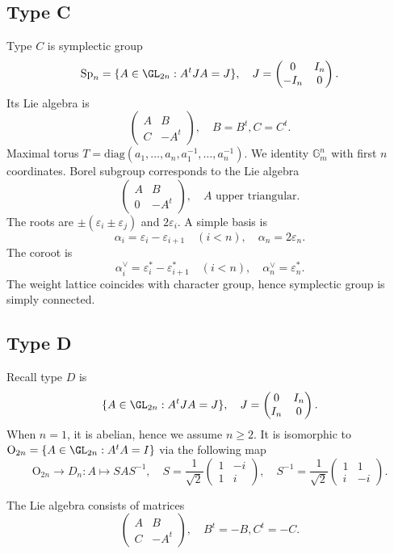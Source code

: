\documentclass[a4paper]{amsart}
\newcommand{\BG}{{\mathbb {G}}} \newcommand{\BH}{{\mathbb {H}}}
\newcommand{\RO}{{\mathrm {O}}} \newcommand{\RP}{{\mathrm {P}}}
\newcommand{\diag}{{\mathrm{diag}}}
\newcommand{\Sp}{{\mathrm{Sp}}}\newcommand{\PB}{{\mathrm{PB}}}
\theoremstyle{plain}
\theoremstyle{remark} \newtheorem{remark}[thm]{Remark}
\theoremstyle{remark} \newtheorem{exercise}{Exercise}
\theoremstyle{remark} \newtheorem{example}{Example}
\numberwithin{equation}{section}
\begin{document}
\subsection{Type C}

Type $C$ is symplectic group
\[\Sp_n=\{A\in\GL_{2n}:A^tJA=J\},\quad J=\begin{pmatrix}0&I_n\\-I_n&0\end{pmatrix}.\]
Its Lie algebra is
\[\begin{pmatrix}A&B\\C&-A^t\end{pmatrix},\quad B=B^t,C=C^t.\]
Maximal torus $T=\diag(a_1,\ldots,a_n,a_1^{-1},\ldots,a_n^{-1})$. We identity $\BG_m^n$ with first $n$ coordinates. Borel subgroup corresponds to the Lie algebra
\[\begin{pmatrix}A&B\\0&-A^t\end{pmatrix},\quad A\text{ upper triangular}.\]
The roots are $\pm(\varepsilon_i\pm\varepsilon_j)$ and $2\varepsilon_i$. A simple basis is
\[\alpha_i=\varepsilon_i-\varepsilon_{i+1}\quad (i<n),\quad\alpha_n=2\varepsilon_n.\]
The coroot is
\[\alpha_i^\vee=\varepsilon_i^*-\varepsilon_{i+1}^*\quad(i<n),\quad \alpha_n^\vee=\varepsilon_n^*.\]
The weight lattice coincides with character group, hence symplectic group is simply connected.

\subsection{Type D}

Recall type $D$ is
\[\{A\in\GL_{2n}: A^tJA=J\},\quad J=\begin{pmatrix}0&I_n\\I_n&0\end{pmatrix}.\]
When $n=1$, it is abelian, hence we assume $n\geqslant 2$. It is isomorphic to $\RO_{2n}=\{A\in\GL_{2n}:A^tA=I\}$ via the following map
\[\RO_{2n}\to D_n:A\mapsto SAS^{-1},\quad S=\frac{1}{\sqrt 2}\begin{pmatrix}1&-i\\1&i\end{pmatrix},\quad S^{-1}=\frac{1}{\sqrt 2}\begin{pmatrix}1&1\\i&-i\end{pmatrix}.\]


The Lie algebra consists of matrices
\[\begin{pmatrix}A&B\\C&-A^t\end{pmatrix},\quad B^t=-B,C^t=-C.\]
\end{document}
